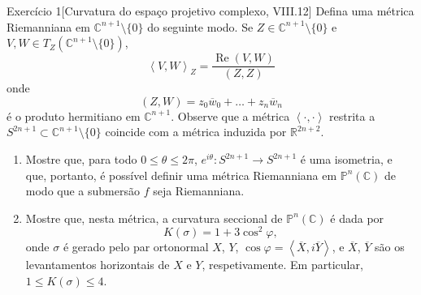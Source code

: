 \begin{thing6}{Exercício 1}[Curvatura do espaço projetivo complexo, \cite{doc} VIII.12]\label{exer:1}\leavevmode
Defina uma métrica Riemanniana  em \(\mathbb{C}^{n+1}\setminus\{0\}\) do seguinte modo. Se \(Z \in \mathbb{C}^{n+1}\setminus\{0\}\) e \(V,W \in T_Z (\mathbb{C}^{n+1}\setminus\{0\})\),
\[\left<V,W\right>_Z=\frac{\operatorname{Re}(V,W)}{(Z,Z)}\]
onde 
\[(Z,W)=z_0\overline{w}_0+\ldots+z_n\overline{w}_n\]
é o produto hermitiano em \(\mathbb{C}^{n+1}\). Observe que a métrica \(\left<\cdot,\cdot\right>\) restrita a \(S^{2n+1}\subset \mathbb{C}^{n+1}\setminus\{0\}\) coincide com a métrica induzida por \(\mathbb{R}^{2n+2}\).
\begin{enumerate}[label=(\alph*)]
\item Mostre que, para todo \(0\leq \theta \leq 2\pi\), \(e^{i\theta}:S^{2n+1}\to S^{2n+1}\) é uma isometria, e que, portanto, é possível definir uma métrica Riemanniana em \(\mathbb{P}^n(\mathbb{C})\) de modo que a submersão \(f\) seja Riemanniana.

\item Mostre que, nesta métrica, a curvatura seccional de \(\mathbb{P}^n(\mathbb{C})\) é dada por
	\[\boxed{K(\sigma)=1+3\cos^2\varphi},\]
onde \(\sigma\) é gerado pelo par ortonormal \(X\), \(Y\), \(\cos \varphi=\left<\overline{X},i\overline{Y}\right>\), e \(\overline{X}\), \(\overline{Y}\) são os levantamentos horizontais de \(X\) e \(Y\), respetivamente. Em particular, \(1 \leq  K(\sigma) \leq  4\).
\end{enumerate}
\end{thing6}

